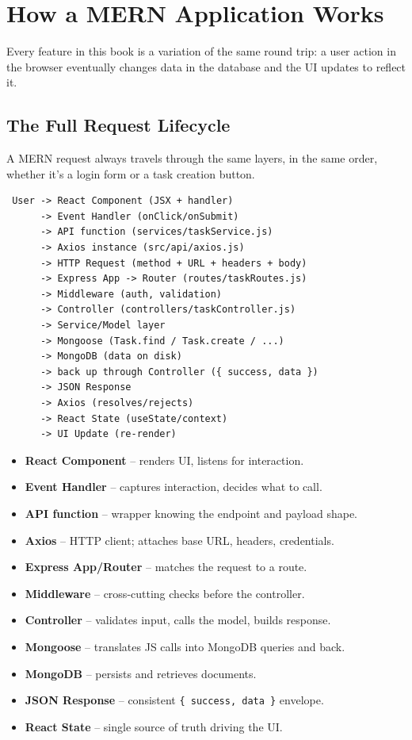 \chapter{How a MERN Application Works}

Every feature in this book is a variation of the same round trip: a user
action in the browser eventually changes data in the database and the UI
updates to reflect it.

\section{The Full Request Lifecycle}

A MERN request always travels through the same layers, in the same order,
whether it's a login form or a task creation button.

\begin{diagrambox}
\begin{verbatim}
 User -> React Component (JSX + handler)
      -> Event Handler (onClick/onSubmit)
      -> API function (services/taskService.js)
      -> Axios instance (src/api/axios.js)
      -> HTTP Request (method + URL + headers + body)
      -> Express App -> Router (routes/taskRoutes.js)
      -> Middleware (auth, validation)
      -> Controller (controllers/taskController.js)
      -> Service/Model layer
      -> Mongoose (Task.find / Task.create / ...)
      -> MongoDB (data on disk)
      -> back up through Controller ({ success, data })
      -> JSON Response
      -> Axios (resolves/rejects)
      -> React State (useState/context)
      -> UI Update (re-render)
\end{verbatim}
\end{diagrambox}

\begin{itemize}
  \item \textbf{React Component} -- renders UI, listens for interaction.
  \item \textbf{Event Handler} -- captures interaction, decides what to call.
  \item \textbf{API function} -- wrapper knowing the endpoint and payload shape.
  \item \textbf{Axios} -- HTTP client; attaches base URL, headers, credentials.
  \item \textbf{Express App/Router} -- matches the request to a route.
  \item \textbf{Middleware} -- cross-cutting checks before the controller.
  \item \textbf{Controller} -- validates input, calls the model, builds response.
  \item \textbf{Mongoose} -- translates JS calls into MongoDB queries and back.
  \item \textbf{MongoDB} -- persists and retrieves documents.
  \item \textbf{JSON Response} -- consistent \texttt{\{ success, data \}} envelope.
  \item \textbf{React State} -- single source of truth driving the UI.
\end{itemize}

